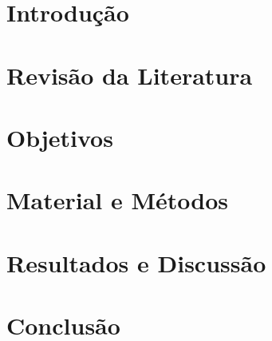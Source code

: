 \documentclass[
	12pt,				%
	openany,			%
	twoside,			%
	a4paper,			%
	chapter=TITLE,		%
	english,			%
	brazil				%
	]{abntex2}
\begin{document}
\chapter{Introdução}





%

\chapter{Revisão da Literatura}\label{cap_trabalho_academico}



\chapter{Objetivos}

\chapter{Material e Métodos}

\chapter{Resultados e Discussão}


\chapter{Conclusão}


\postextual
\end{document}
